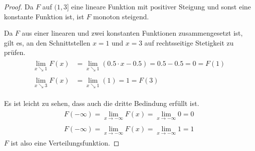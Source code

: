 \documentclass[a4paper]{scrartcl}
\begin{document}
\begin{enumerate}[label=\bfseries\arabic*.]
\begin{enumerate}[label=(\alph*)]
\begin{proof}
                    Da $F$ auf $(1, 3]$ eine lineare Funktion mit positiver
                    Steigung und sonst eine konstante Funktion ist, ist $F$
                    monoton steigend.

                    Da $F$ aus einer linearen und zwei konstanten Funktionen
                    zusammengesetzt ist, gilt es, an den Schnittstellen $x = 1$
                    und $x = 3$ auf rechtsseitige Stetigkeit zu prüfen.
                    \begin{align*}
                        \begin{split}
                            \lim_{x \searrow 1} F(x)
                            &= \lim_{x \searrow 1}
                            ( \num{0,5} \cdot x - \num{0,5})
                            = \num{0,5} - \num{0,5}
                            = 0
                            = F(1)
                        \end{split} \\
                        \begin{split}
                            \lim_{x \searrow 3} F(x)
                            &= \lim_{x \searrow 1} (1)
                            = 1
                            = F(3)
                        \end{split}
                    \end{align*}

                    Es ist leicht zu sehen, dass auch die dritte Bedindung
                    erfüllt ist.
                    \begin{align*}
                        \begin{split}
                            F(-\infty) = \lim_{x \to -\infty} F(x)
                                = \lim_{x \to -\infty} 0
                                = 0
                        \end{split} \\
                        \begin{split}
                            F(-\infty) = \lim_{x \to -\infty} F(x)
                                = \lim_{x \to -\infty} 1
                                = 1
                        \end{split}
                    \end{align*}
                    $F$ ist also eine Verteilungsfunktion.
                \end{proof}


\end{enumerate}
\end{enumerate}
\end{document}
